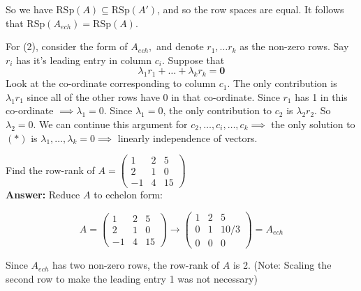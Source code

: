 \documentclass[10pt]{scrartcl}
\begin{document}
So we have $\text{RSp}(A) \subseteq \text{RSp}(A')$, and so the row spaces are equal. It follows that $\text{RSp}(A_{ech}) = \text{RSp}(A)$.

For (2), consider the form of $A_{ech},$ and denote $r_1,\dots r_k$ as the non-zero rows. Say $r_i$ has it's leading entry in column $c_i$. Suppose that \[\lambda_1r_1 + \dots + \lambda_kr_k = \mathbf{0} \tag{$*$}\]
  Look at the co-ordinate corresponding to column $c_1$. The only contribution is $\lambda_1r_1$ since all of the other rows have 0 in that co-ordinate. Since $r_1$ has 1 in this co-ordinate $\implies \lambda_1 = 0$. Since $\lambda_1 = 0$, the only contribution to $c_2$ is $\lambda_2r_2$. So $\lambda_2 = 0$. We can continue this argument for $c_2, \dots, c_i, \dots, c_k \implies$ the only solution to $(*)$ is $\lambda_1, \dots, \lambda_k = 0 \implies $ linearly independence of vectors.\\
  

\begin{example}  
Find the row-rank of $A = \begin{pmatrix}
 1 & 2 & 5\\ 2 & 1 & 0 \\ -1& 4 & 15
 \end{pmatrix}
$ \\

\noindent \textbf{Answer:} Reduce $A$ to echelon form: 

\[A  = \begin{pmatrix}
 1 & 2 & 5\\ 2 & 1 & 0 \\ -1& 4 & 15
 \end{pmatrix} \to \begin{pmatrix}
1 & 2 & 5 \\ 0 & 1 & 10/3 \\ 0 & 0 & 0
\end{pmatrix} = A_{ech}\]

Since $A_{ech}$ has two non-zero rows, the row-rank of $A$ is 2. (Note: Scaling the second row to make the leading entry 1 was not necessary)
\end{example}\vspace*{10pt}
\end{document}
